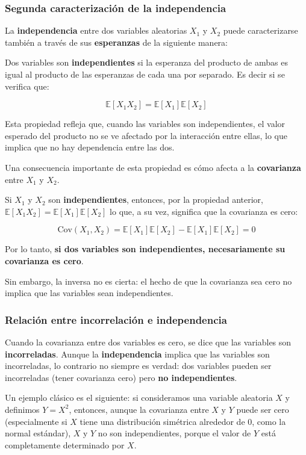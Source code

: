 \documentclass[
]{article}
\begin{document}
\subsubsection{Segunda caracterización de la independencia}\label{segunda-caracterizaciuxf3n-de-la-independencia}

La \textbf{independencia} entre dos variables aleatorias \(X_1\) y \(X_2\) puede caracterizarse también a través de sus \textbf{esperanzas} de la siguiente manera:

Dos variables son \textbf{independientes} si la esperanza del producto de ambas es igual al producto de las esperanzas de cada una por separado. Es decir si se verifica que:

\[
\mathbb{E}[X_1 X_2] = \mathbb{E}[X_1] \mathbb{E}[X_2]
\]

Esta propiedad refleja que, cuando las variables son independientes, el valor esperado del producto no se ve afectado por la interacción entre ellas, lo que implica que no hay dependencia entre las dos.

Una consecuencia importante de esta propiedad es cómo afecta a la \textbf{covarianza} entre \(X_1\) y \(X_2\).

Si \(X_1\) y \(X_2\) son \textbf{independientes}, entonces, por la propiedad anterior, \(\mathbb{E}[X_1 X_2] = \mathbb{E}[X_1] \mathbb{E}[X_2]\) lo que, a su vez, significa que la covarianza es cero:

\[
\text{Cov}(X_1, X_2) = \mathbb{E}[X_1]\mathbb{E}[X_2] - \mathbb{E}[X_1]\mathbb{E}[X_2] = 0
\]

Por lo tanto, \textbf{si dos variables son independientes, necesariamente su covarianza es cero}.

Sin embargo, la inversa no es cierta: el hecho de que la covarianza sea cero no implica que las variables sean independientes.

\subsubsection{Relación entre incorrelación e independencia}\label{relaciuxf3n-entre-incorrelaciuxf3n-e-independencia}

Cuando la covarianza entre dos variables es cero, se dice que las variables son \textbf{incorreladas}.
Aunque la \textbf{independencia} implica que las variables son incorreladas, lo contrario no siempre es verdad: dos variables pueden ser incorreladas (tener covarianza cero) pero \textbf{no independientes}.

Un ejemplo clásico es el siguiente: si consideramos una variable aleatoria \(X\) y definimos \(Y = X^2\), entonces, aunque la covarianza entre \(X\) y \(Y\) puede ser cero (especialmente si \(X\) tiene una distribución simétrica alrededor de 0, como la normal estándar), \(X\) y \(Y\) no son independientes, porque el valor de \(Y\) está completamente determinado por \(X\).
\end{document}
